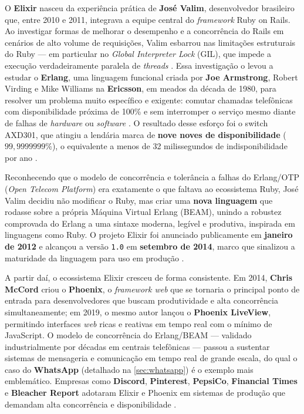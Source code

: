 \documentclass[
	12pt,
	openany,
	oneside,
	a4paper,
	english,
	brazil
]{abntex2}
\begin{document}
O \textbf{Elixir} nasceu da experiência prática de \textbf{José Valim}, desenvolvedor brasileiro que, entre 2010 e 2011, integrava a equipe central do \textit{framework} Ruby on Rails. Ao investigar formas de melhorar o desempenho e a concorrência do Rails em cenários de alto volume de requisições, Valim esbarrou nas limitações estruturais do Ruby --- em particular no \textit{Global Interpreter Lock} (GIL), que impede a execução verdadeiramente paralela de \textit{threads} \cite{elixir2024}. Essa investigação o levou a estudar o \textbf{Erlang}, uma linguagem funcional criada por \textbf{Joe Armstrong}, Robert Virding e Mike Williams na \textbf{Ericsson}, em meados da década de 1980, para resolver um problema muito específico e exigente: comutar chamadas telefônicas com disponibilidade próxima de 100\% e sem interromper o serviço mesmo diante de falhas de \textit{hardware} ou \textit{software} \cite{armstrong2003}. O resultado desse esforço foi o switch AXD301, que atingiu a lendária marca de \textbf{nove noves de disponibilidade} ($99,9999999\%$), o equivalente a menos de 32 milissegundos de indisponibilidade por ano \cite{armstrong2013}.

Reconhecendo que o modelo de concorrência e tolerância a falhas do Erlang/OTP (\textit{Open Telecom Platform}) era exatamente o que faltava ao ecossistema Ruby, José Valim decidiu não modificar o Ruby, mas criar uma \textbf{nova linguagem} que rodasse sobre a própria Máquina Virtual Erlang (BEAM), unindo a robustez comprovada do Erlang a uma sintaxe moderna, legível e produtiva, inspirada em linguagens como Ruby. O projeto Elixir foi anunciado publicamente em \textbf{janeiro de 2012} e alcançou a versão \texttt{1.0} em \textbf{setembro de 2014}, marco que sinalizou a maturidade da linguagem para uso em produção \cite{elixir2024}.

A partir daí, o ecossistema Elixir cresceu de forma consistente. Em 2014, \textbf{Chris McCord} criou o \textbf{Phoenix}, o \textit{framework web} que se tornaria o principal ponto de entrada para desenvolvedores que buscam produtividade e alta concorrência simultaneamente; em 2019, o mesmo autor lançou o \textbf{Phoenix LiveView}, permitindo interfaces \textit{web} ricas e reativas em tempo real com o mínimo de JavaScript. O modelo de concorrência do Erlang/BEAM --- validado industrialmente por décadas em centrais telefônicas --- passou a sustentar sistemas de mensageria e comunicação em tempo real de grande escala, do qual o caso do \textbf{WhatsApp} (detalhado na \autoref{sec:whatsapp}) é o exemplo mais emblemático. Empresas como \textbf{Discord}, \textbf{Pinterest}, \textbf{PepsiCo}, \textbf{Financial Times} e \textbf{Bleacher Report} adotaram Elixir e Phoenix em sistemas de produção que demandam alta concorrência e disponibilidade \cite{phoenix2024}.
\end{document}
